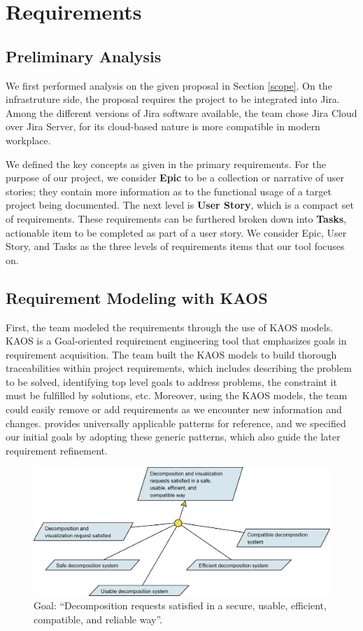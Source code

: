 \section{Requirements}
\label{requirement}

\subsection{Preliminary Analysis}
We first performed analysis on the given proposal in Section \ref{scope}. On the infrastruture side, the proposal requires the project to be integrated into Jira. Among the different versions of Jira software available, the team chose Jira Cloud over Jira Server, for its cloud-based nature is more compatible in modern workplace. 

We defined the key concepts as given in the primary requirements. For the purpose of our project, we consider
\textbf{Epic} to be a collection or narrative of user stories; they contain more information as to the functional usage of a target project being documented. The next level is \textbf{User Story}, which is a compact set of requirements. These requirements can be furthered broken down into \textbf{Tasks}, actionable item to be completed as part of a user story. 
We consider Epic, User Story, and Tasks as the three levels of requirements items that our tool focuses on. 

\subsection{Requirement Modeling with KAOS}
First, the team modeled the requirements through the use of KAOS models\cite{KAOS}. KAOS is a Goal-oriented requirement engineering \cite{GOAL} tool that emphasizes goals in requirement acquisition. The team built the KAOS models to build thorough traceabilities within project requirements, which includes describing the problem to be solved, identifying top level goals to address problems, the constraint it must be fulfilled by solutions, etc. Moreover, using the KAOS models, the team could easily remove or add requirements as we encounter new information and changes. \cite{KAOS} provides universally applicable patterns for reference, and we specified our initial goals by adopting these generic patterns, which also guide the later requirement refinement.

\begin{figure}
\centering
\includegraphics[width=\textwidth,keepaspectratio]{./figure/GoalsNFR1.png}
\caption{Goal: “Decomposition requests satisfied in a secure, usable, efficient, compatible, and reliable way”.}
\label{goal1}
\end{figure}

